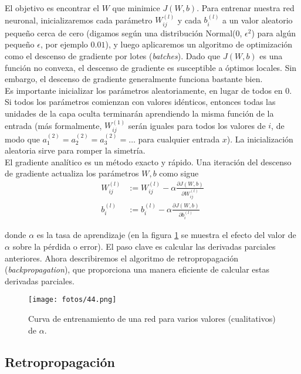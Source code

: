 El objetivo es encontrar el $W$ que minimice $J(W,b)$. Para entrenar nuestra red neuronal, inicializaremos cada parámetro $W^{(l)}_{ij}$ y cada $b^{(l)}_i$ a un valor aleatorio pequeño cerca de cero (digamos según una distribución Normal(0, $\epsilon^2$) para algún pequeño $\epsilon$, por ejemplo $0.01$), y luego aplicaremos un algoritmo de optimización como el descenso de gradiente por lotes (\textit{batches}). Dado que $J(W,b)$ es una función no convexa, el descenso de gradiente es susceptible a óptimos locales. Sin embargo, el descenso de gradiente generalmente funciona bastante bien. \\

Es importante inicializar los parámetros aleatoriamente, en lugar de todos en 0. Si todos los parámetros comienzan con valores idénticos, entonces todas las unidades de la capa oculta terminarán aprendiendo la misma función de la entrada (más formalmente, $W^{(1)}_{ij}$ serán iguales para todos los valores de $i$, de modo que $a^{(2)}_1 = a^{(2)}_2 = a^{(2)}_3 = \dots$ para cualquier entrada $x$). La inicialización aleatoria sirve para romper la simetría. \\

El gradiente analítico es un método exacto y rápido. Una iteración del descenso de gradiente actualiza los parámetros $W,b$ como sigue
\begin{align}
W^{(l)}_{ij} &:= W^{(l)}_{ij} - \alpha \frac{\partial J (W, b)}{\partial W^{(l)}_{ij}} \\
b^{(l)}_i &:= b^{(l)}_i - \alpha \frac{\partial J (W, b)}{\partial b^{(l)}_i}
\end{align}

\noindent donde $\alpha$ es la tasa de aprendizaje (en la figura \ref{fig:7.5} se muestra el efecto del valor de $\alpha$ sobre la pérdida o error). El paso clave es calcular las derivadas parciales anteriores. Ahora describiremos el algoritmo de retropropagación (\textit{backpropagation}), que proporciona una manera eficiente de calcular estas derivadas parciales. \\

\begin{figure}[h]
\centering
\texttt{[image: fotos/44.png]}
\caption{Curva de entrenamiento de una red para varios valores (cualitativos) de $\alpha$.}
\label{fig:7.5}
\end{figure}

\subsection{Retropropagación}

